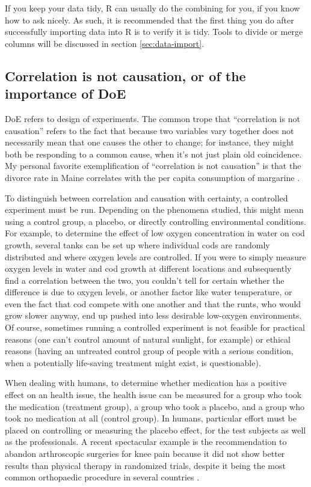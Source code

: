 \documentclass{report}
\begin{document}
		If you keep your data tidy, R can usually do the combining for you, if you know how to ask nicely. As such, it is recommended that the first thing you do after successfully importing data into R is to verify it is tidy. Tools to divide or merge columns will be discussed in section \ref{sec:data-import}.
	
		\subsection{Correlation is not causation, or of the importance of DoE}
		DoE refers to design of experiments. The common trope that ``correlation is not causation'' refers to the fact that because two variables vary together does not necessarily mean that one causes the other to change; for instance, they might both be responding to a common cause, when it's not just plain old coincidence. My personal favorite exemplification of ``correlation is not causation'' is that the divorce rate in Maine correlates with the per capita consumption of margarine \cite{vigen}.
	
		To distinguish between correlation and causation with certainty, a controlled experiment must be run. Depending on the phenomena studied, this might mean using a control group, a placebo, or directly controlling environmental conditions. For example, to determine the effect of low oxygen concentration in water on cod growth, several tanks can be set up where individual cods are randomly distributed and where oxygen levels are controlled. If you were to simply measure oxygen levels in water and cod growth at different locations and subsequently find a correlation between the two, you couldn't tell for certain whether the difference is due to oxygen levels, or another factor like water temperature, or even the fact that cod compete with one another and that the runts, who would grow slower anyway, end up pushed into less desirable low-oxygen environments. Of course, sometimes running a controlled experiment is not feasible for practical reasons (one can't control amount of natural sunlight, for example) or ethical reasons (having an untreated control group of people with a serious condition, when a potentially life-saving treatment might exist, is questionable).
	
		When dealing with humans, to determine whether medication has a positive effect on an health issue, the health issue can be measured for a group who took the medication (treatment group), a group who took a placebo, and a group who took no medication at all (control group). In humans, particular effort must be placed on controlling or measuring the placebo effect, for the test subjects as well as the professionals. A recent spectacular example is the recommendation to abandon arthroscopic surgeries for knee pain because it did not show better results than physical therapy in randomized trials, despite it being the most common orthopaedic procedure in several countries \cite{knee}.
	
\end{document}
